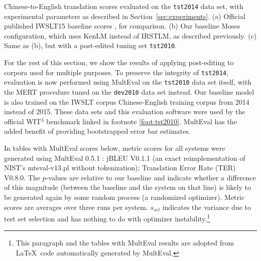{\begin{table}[ht]
\caption{ \label{tab:tst2010}
    Chinese-to-English translation scores evaluated on the {\small \tt tst2014} data set, with experimental parameters as described in Section~\ref{sec:experiments}. 
    (a) Official published IWSLT15 baseline scores , for comparison.
    (b) Our baseline Moses configuration, which uses KenLM instead of IRSTLM, as described previously.
    (c) Same as (b), but with a post-edited tuning set {\small \tt tst2010}. 
} %
\end{table}

For the rest of this section, we show the results of applying post-editing to corpora used for multiple purposes.
To preserve the integrity of {\small \tt tst2014}, evaluation is now performed using MultEval  on the {\small \tt tst2010} data set itself, with the MERT procedure tuned on the {\small \tt dev2010} data set instead.
Our baseline model is also trained on the IWSLT corpus Chinese-English training corpus from 2014 instead of 2015.
These data sets and this evaluation software were used by the official WIT$^3$ benchmark linked in footnote \ref{foot:tst2010}.
MultEval has the added benefit of providing bootstrapped error bar estimates.

In tables with MultEval scores below, metric scores for all systems were generated using MultEval 0.5.1 : jBLEU V0.1.1 (an exact reimplementation of NIST's mteval-v13.pl without tokenization); Translation Error Rate (TER) V0.8.0. 
The $p$-values are relative to our baseline and indicate whether a difference of this magnitude (between the baseline and the system on that line) is likely to be generated again by some random process (a randomized optimizer). 
Metric scores are averages over three runs per system. 
$s_{sel}$ indicates the variance due to test set selection and has nothing to do with optimizer instability.\footnote{
    This paragraph and the tables with MultEval results are adopted from \LaTeX~code automatically generated by MultEval.
}






}
